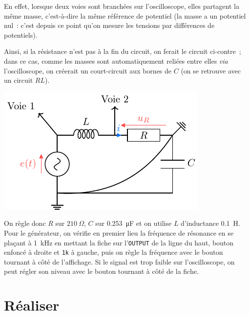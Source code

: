 \documentclass[../main/main.tex]{subfiles}
\begin{document}
{\begin{minipage}{0.40\linewidth}
\begin{center}
		\end{center}
	\end{minipage}
	\hfill
	\begin{minipage}{0.55\linewidth}
		En effet, lorsque deux voies sont branchées sur l'oscilloscope, elles
		partagent la même masse, c'est-à-dire la même référence de potentiel (la
		masse a un potentiel nul~: c'est depuis ce point qu'on mesure les tensions
		par différences de potentiels).
	\end{minipage}
	\begin{minipage}{0.55\linewidth}
		Ainsi, si la résistance n'est pas à la fin du circuit, on ferait le circuit
		ci-contre~; dans ce cas, comme les masses sont
		automatiquement reliées entre elles \textit{via} l'oscilloscope, on
		créerait un court-circuit aux bornes de $C$ (on se retrouve avec un circuit
		$RL$).
	\end{minipage}
	\hfill
	\begin{minipage}{0.40\linewidth}
		\vspace{-10pt}
		\begin{center}
			\includegraphics[width=.8\linewidth]{rlc_r-wrong}
		\end{center}
	\end{minipage}
	On règle donc $R$ sur $\SI{210}{\Omega}$, $C$ sur \SI{0.253}{\micro F}
	et on utilise $L$ d'inductance \SI{0.1}{H}. Pour le générateur, on
	vérifie en premier lieu la fréquence de résonance en se plaçant à
	\SI{1}{kHz} en mettant la fiche sur l'\texttt{OUTPUT} de la ligne du
	haut, bouton \fbox{$\sim$} enfoncé à droite et \texttt{1k} à gauche,
	puis on règle la fréquence avec le bouton tournant à côté de
	l'affichage. Si le signal est trop faible sur l'oscilloscope, on peut
	régler son niveau avec le bouton tournant à côté de la fiche.
}

\section{Réaliser}
\end{document}
